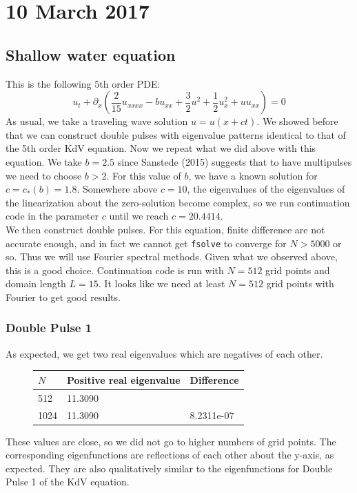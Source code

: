 \documentclass[12pt]{article}
\begin{document}
\section*{10 March 2017}
\subsection*{Shallow water equation}
This is the following 5th order PDE:
\[
u_t + \partial _x\left( \frac{2}{15}u_{xxxx} - b u_{xx} + \frac{3}{2}u^2 + \frac{1}{2}u_x^2 + u u_{xx} \right) = 0
\]
As usual, we take a traveling wave solution $u = u(x + ct)$. We showed before that we can construct double pulses with eigenvalue patterns identical to that of the 5th order KdV equation. Now we repeat what we did above with this equation. We take $b = 2.5$ since Sanstede (2015) suggests that to have multipulses we need to choose $b > 2$. For this value of $b$, we have a known solution for $c = c_*(b) = 1.8$. Somewhere above $c = 10$, the eigenvalues of the eigenvalues of the linearization about the zero-solution become complex, so we run continuation code in the parameter $c$ until we reach $c = 20.4414$. \\

We then construct double pulses. For this equation, finite difference are not accurate enough, and in fact we cannot get \texttt{fsolve} to converge for $N > 5000$ or so. Thus we will use Fourier spectral methods. Given what we observed above, this is a good choice. Continuation code is run with $N = 512$ grid points and domain length $L = 15$. It looks like we need at least $N = 512$ grid points with Fourier to get good results.

\subsubsection*{Double Pulse 1}
As expected, we get two real eigenvalues which are negatives of each other.
\begin{figure}[H]
\begin{tabular}{l|ll}
$N$    & Positive real eigenvalue      &  Difference      \\ \hline
  512  &        11.3090  &        \\ 
  1024 &        11.3090  &      8.2311e-07  \\
\end{tabular}
\end{figure}
These values are close, so we did not go to higher numbers of grid points. The corresponding eigenfunctions are reflections of each other about the y-axis, as expected. They are also qualitatively similar to the eigenfunctions for Double Pulse 1 of the KdV equation.
\end{document}
